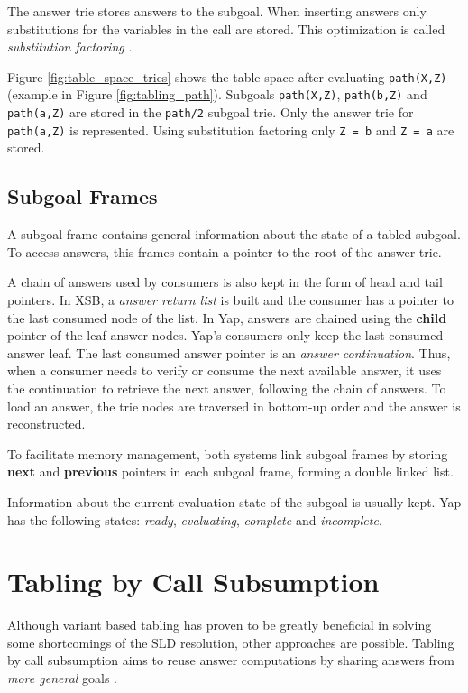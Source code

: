 The answer trie stores answers to the subgoal. When inserting answers only substitutions
for the variables in the call are stored. This optimization is called \textit{substitution factoring} \cite{RamakrishnanIV-95}.

Figure \ref{fig:table_space_tries} shows the table space after evaluating \texttt{path(X,Z)} (example in Figure \ref{fig:tabling_path}).
Subgoals \texttt{path(X,Z)}, \texttt{path(b,Z)} and \texttt{path(a,Z)} are stored in the \texttt{path/2} subgoal trie.
Only the answer trie for \texttt{path(a,Z)} is represented. Using substitution factoring only \texttt{Z = b} and \texttt{Z = a}
are stored.

\subsection{Subgoal Frames}

A subgoal frame contains general information about the state of a tabled subgoal.
To access answers, this frames contain a pointer to the root of the answer trie.

A chain of answers used by consumers is also kept in the form of head and tail pointers.
In XSB, a \textit{answer return list} is built and the consumer has a pointer to the last consumed node of the list.
In Yap, answers are chained using the \textbf{child} pointer of the leaf answer nodes. Yap's consumers only keep
the last consumed answer leaf. The last consumed answer pointer is an \textit{answer continuation}. Thus, when
a consumer needs to verify or consume the next available answer, it uses the continuation to retrieve the next
answer, following the chain of answers. To load an answer, the trie nodes are traversed in bottom-up order and the answer is reconstructed.

To facilitate memory management, both systems link subgoal frames by storing \textbf{next} and \textbf{previous} pointers in each subgoal frame,
forming a double linked list.

Information about the current evaluation state of the subgoal is usually kept. Yap has the following states:
\textit{ready}, \textit{evaluating}, \textit{complete} and \textit{incomplete}.

\section{Tabling by Call Subsumption} \label{sec:subsumption}

Although variant based tabling has proven to be greatly beneficial in solving some shortcomings of the SLD resolution,
other approaches are possible. Tabling by call subsumption aims to reuse answer computations by sharing answers from
\textit{more general} goals \cite{Johnson-99}.

